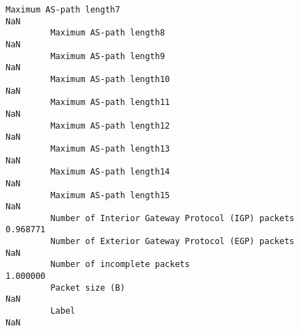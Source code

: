 \documentclass[11pt]{article}
\begin{document}
\begin{Verbatim}[commandchars=\\\{\}]
         Maximum AS-path length7                                                     NaN   
         Maximum AS-path length8                                                     NaN   
         Maximum AS-path length9                                                     NaN   
         Maximum AS-path length10                                                    NaN   
         Maximum AS-path length11                                                    NaN   
         Maximum AS-path length12                                                    NaN   
         Maximum AS-path length13                                                    NaN   
         Maximum AS-path length14                                                    NaN   
         Maximum AS-path length15                                                    NaN   
         Number of Interior Gateway Protocol (IGP) packets                      0.968771   
         Number of Exterior Gateway Protocol (EGP) packets                           NaN   
         Number of incomplete packets                                           1.000000   
         Packet size (B)                                                             NaN   
         Label                                                                       NaN   
         

\end{Verbatim}
\end{document}
